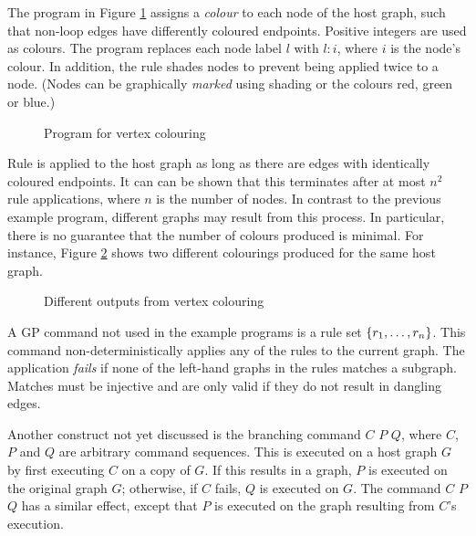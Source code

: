 \begin{example}
The program in Figure \ref{fig:vertex-colouring} assigns a \emph{colour}\/ to each node of the host graph, such that non-loop edges have differently coloured endpoints. Positive integers are used as colours. The program replaces each node label $l$\/ with $l{:}i$, where $i$\/ is the node's colour. In addition, the rule  shades nodes to prevent being applied twice to a node. (Nodes can be graphically \emph{marked}\/ using shading or the colours red, green or blue.)

\begin{figure}[htb]
\begin{center}
 
\end{center}
\caption{Program for vertex colouring}\label{fig:vertex-colouring}
\end{figure}

Rule  is applied to the host graph as long as there are edges with identically coloured endpoints. It can can be shown that this terminates after at most $n^2$ rule applications, where $n$\/ is the number of nodes. In contrast to the previous example program, different graphs may result from this process. In particular, there is no guarantee that the number of colours produced is minimal. For instance, Figure \ref{fig:colour_results} shows two different colourings produced for the same host graph.
\end{example}

\begin{figure}[htb]
\begin{center}
 
\end{center}
\caption{Different outputs from vertex colouring}\label{fig:colour_results}
\end{figure}

A GP command not used in the example programs is a rule set $\mathtt{\{}r_1,\dots,r_n\mathtt{\}}$. This command non-deterministically applies any of the rules to the current graph. The application \emph{fails}\/ if none of the left-hand graphs in the rules matches a subgraph. Matches must be injective and are only valid if they do not result in dangling edges.

Another construct not yet discussed is the branching command  $C$  $P$  $Q$, where $C$, $P$ and $Q$ are arbitrary command sequences. This is executed on a host graph $G$ by first executing $C$ on a copy of $G$. If this results in a graph, $P$\/ is executed on the original graph $G$; otherwise, if $C$ fails, $Q$ is executed on $G$. The command  $C$  $P$  $Q$ has a similar effect, except that $P$\/ is executed on the graph resulting from $C$'s execution. 
